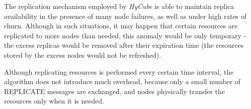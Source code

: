 The replication mechanism employed by \emph{HyCube} is able to maintain replica availability in the presence of many node failures, as well as under high rates of churn. Although in such situations, it may happen that certain resources are replicated to more nodes than needed, this anomaly would be only temporary - the excess replicas would be removed after their expiration time (the resources stored by the excess nodes would not be refreshed).

Although replicating resources is performed every certain time interval, the algorithm does not introduce much overhead, because only a small number of REPLICATE messages are exchanged, and nodes physically transfer the resources only when it is needed.









